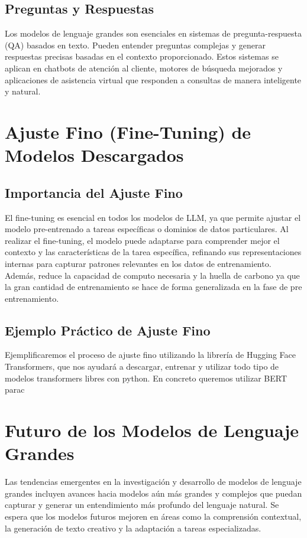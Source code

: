 \subsection{Preguntas y Respuestas}
Los modelos de lenguaje grandes son esenciales en sistemas de pregunta-respuesta (QA) basados en texto. Pueden entender preguntas complejas y generar respuestas precisas basadas en el contexto proporcionado. Estos sistemas se aplican en chatbots de atención al cliente, motores de búsqueda mejorados y aplicaciones de asistencia virtual que responden a consultas de manera inteligente y natural.
\section{Ajuste Fino (Fine-Tuning) de Modelos Descargados}
\subsection{Importancia del Ajuste Fino}
      El fine-tuning es esencial en todos los modelos de LLM, ya que permite ajustar el modelo pre-entrenado a tareas específicas o dominios de datos particulares. Al realizar el fine-tuning, el modelo puede adaptarse para comprender mejor el contexto y las características de la tarea específica, refinando sus representaciones internas para capturar patrones relevantes en los datos de entrenamiento. Además, reduce la capacidad de computo necesaria y la huella de carbono ya que la gran cantidad de entrenamiento se hace de forma generalizada en la fase de pre entrenamiento.


\subsection{Ejemplo Práctico de Ajuste Fino}
      Ejemplificaremos el proceso de ajuste fino utilizando la librería de Hugging Face Transformers, que nos ayudará a descargar, entrenar y utilizar todo tipo de modelos transformers libres con python.
      En concreto queremos utilizar BERT parac
\section{Futuro de los Modelos de Lenguaje Grandes}
   Las tendencias emergentes en la investigación y desarrollo de modelos de lenguaje grandes incluyen avances hacia modelos aún más grandes y complejos que puedan capturar y generar un entendimiento más profundo del lenguaje natural. Se espera que los modelos futuros mejoren en áreas como la comprensión contextual, la generación de texto creativo y la adaptación a tareas especializadas.

